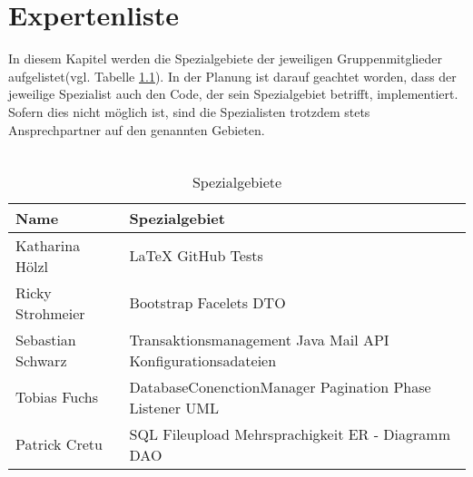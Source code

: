 \chapter{Expertenliste}

In diesem Kapitel werden die Spezialgebiete der jeweiligen Gruppenmitglieder aufgelistet(vgl. Tabelle \ref{fig:spezialgebiete}).
In der Planung ist darauf geachtet worden, dass der jeweilige Spezialist auch den Code, der sein
Spezialgebiet betrifft, implementiert.
Sofern dies nicht möglich ist, sind die Spezialisten trotzdem stets Ansprechpartner auf
den genannten Gebieten.\ \\
\ \\
\begin{table}[h]
	\begin{center}
	\begin{tabular}{|p{6cm}|p{6cm}|}
		\hline \textbf{Name} & \textbf{Spezialgebiet}  \\ 
		\hline Katharina Hölzl & LaTeX \newline
		                         GitHub \newline
		                         Tests    \\ 
		\hline Ricky Strohmeier & Bootstrap \newline
		                          Facelets \newline
		                          DTO  \\ 
		\hline Sebastian Schwarz & Transaktionsmanagement \newline
		                           Java Mail API \newline
		                           Konfigurationsadateien \\ 
		\hline Tobias Fuchs &    DatabaseConenctionManager \newline
		                         Pagination \newline
		                         Phase Listener \newline
		                         UML \\ 
		\hline Patrick Cretu &  SQL \newline
		                        Fileupload \newline
		                        Mehrsprachigkeit \newline
		                        ER - Diagramm \newline
		                        DAO\\ 
		\hline 
	\end{tabular} 
\caption{Spezialgebiete}
\label{fig:spezialgebiete}
\end{center}
\end{table}
